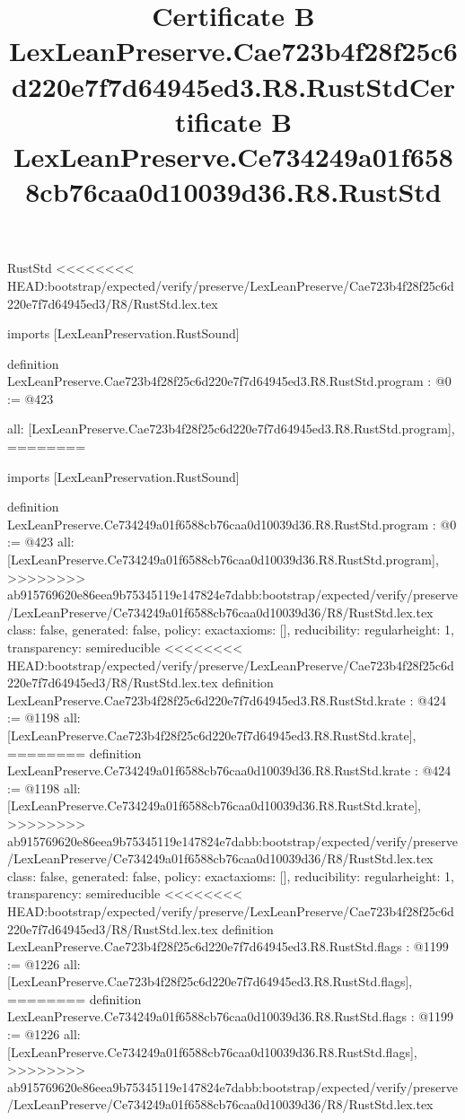 \begin{lexlean}{RustStd}
<<<<<<<< HEAD:bootstrap/expected/verify/preserve/LexLeanPreserve/Cae723b4f28f25c6d220e7f7d64945ed3/R8/RustStd.lex.tex
\title{Certificate B LexLeanPreserve.Cae723b4f28f25c6d220e7f7d64945ed3.R8.RustStd}
\begin{coremodule}
imports [LexLeanPreservation.RustSound]

definition LexLeanPreserve.Cae723b4f28f25c6d220e7f7d64945ed3.R8.RustStd.program : @0 := @423 {
  all: [LexLeanPreserve.Cae723b4f28f25c6d220e7f7d64945ed3.R8.RustStd.program],
========
\title{Certificate B LexLeanPreserve.Ce734249a01f6588cb76caa0d10039d36.R8.RustStd}
\begin{coremodule}
imports [LexLeanPreservation.RustSound]

definition LexLeanPreserve.Ce734249a01f6588cb76caa0d10039d36.R8.RustStd.program : @0 := @423 {
  all: [LexLeanPreserve.Ce734249a01f6588cb76caa0d10039d36.R8.RustStd.program],
>>>>>>>> ab915769620e86eea9b75345119e147824e7dabb:bootstrap/expected/verify/preserve/LexLeanPreserve/Ce734249a01f6588cb76caa0d10039d36/R8/RustStd.lex.tex
  class: false,
  generated: false,
  policy: exact{axioms: []},
  reducibility: regular{height: 1},
  transparency: semireducible
}
<<<<<<<< HEAD:bootstrap/expected/verify/preserve/LexLeanPreserve/Cae723b4f28f25c6d220e7f7d64945ed3/R8/RustStd.lex.tex
definition LexLeanPreserve.Cae723b4f28f25c6d220e7f7d64945ed3.R8.RustStd.krate : @424 := @1198 {
  all: [LexLeanPreserve.Cae723b4f28f25c6d220e7f7d64945ed3.R8.RustStd.krate],
========
definition LexLeanPreserve.Ce734249a01f6588cb76caa0d10039d36.R8.RustStd.krate : @424 := @1198 {
  all: [LexLeanPreserve.Ce734249a01f6588cb76caa0d10039d36.R8.RustStd.krate],
>>>>>>>> ab915769620e86eea9b75345119e147824e7dabb:bootstrap/expected/verify/preserve/LexLeanPreserve/Ce734249a01f6588cb76caa0d10039d36/R8/RustStd.lex.tex
  class: false,
  generated: false,
  policy: exact{axioms: []},
  reducibility: regular{height: 1},
  transparency: semireducible
}
<<<<<<<< HEAD:bootstrap/expected/verify/preserve/LexLeanPreserve/Cae723b4f28f25c6d220e7f7d64945ed3/R8/RustStd.lex.tex
definition LexLeanPreserve.Cae723b4f28f25c6d220e7f7d64945ed3.R8.RustStd.flags : @1199 := @1226 {
  all: [LexLeanPreserve.Cae723b4f28f25c6d220e7f7d64945ed3.R8.RustStd.flags],
========
definition LexLeanPreserve.Ce734249a01f6588cb76caa0d10039d36.R8.RustStd.flags : @1199 := @1226 {
  all: [LexLeanPreserve.Ce734249a01f6588cb76caa0d10039d36.R8.RustStd.flags],
>>>>>>>> ab915769620e86eea9b75345119e147824e7dabb:bootstrap/expected/verify/preserve/LexLeanPreserve/Ce734249a01f6588cb76caa0d10039d36/R8/RustStd.lex.tex
}}}
\end{coremodule}}
\end{coremodule}
\end{lexlean}

